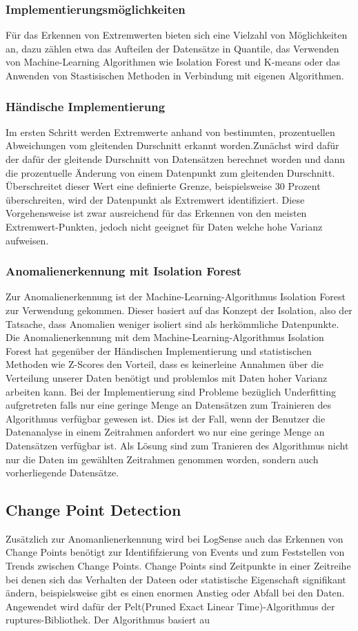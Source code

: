 \documentclass{report}
\begin{document}
\subsubsection{Implementierungsmöglichkeiten}
Für das Erkennen von Extremwerten bieten sich eine Vielzahl von Möglichkeiten an, dazu zählen etwa das Aufteilen der Datensätze in Quantile, das Verwenden von Machine-Learning Algorithmen wie Isolation Forest und K-means oder das Anwenden von Stastisischen Methoden in Verbindung mit eigenen Algorithmen. 
\subsubsection{Händische Implementierung}
Im ersten Schritt werden Extremwerte anhand von bestimmten, prozentuellen Abweichungen vom gleitenden Durschnitt erkannt worden.Zunächst wird dafür der dafür der gleitende Durschnitt von Datensätzen berechnet worden und dann die prozentuelle Änderung von einem Datenpunkt zum gleitenden Durschnitt. Überschreitet dieser Wert eine definierte Grenze, beispielsweise 30 Prozent überschreiten, wird der Datenpunkt als Extremwert identifiziert.
Diese Vorgehensweise ist zwar ausreichend für das Erkennen von den meisten Extremwert-Punkten, jedoch nicht geeignet für Daten welche hohe Varianz aufweisen. 
\subsubsection{Anomalienerkennung mit Isolation Forest}
Zur Anomalienerkennung ist der Machine-Learning-Algorithmus Isolation Forest zur Verwendung gekommen. Dieser basiert auf das Konzept der Isolation, also der Tatsache, dass Anomalien weniger isoliert sind als herkömmliche Datenpunkte. 
Die Anomalienerkennung mit dem Machine-Learning-Algorithmus Isolation Forest hat gegenüber der Händischen Implementierung und statistischen Methoden wie Z-Scores den Vorteil, dass es keinerleine Annahmen über die Verteilung unserer Daten benötigt und problemlos mit Daten hoher Varianz arbeiten kann.
Bei der Implementierung sind Probleme bezüglich Underfitting aufgretreten falls nur eine geringe Menge an Datensätzen zum Trainieren des Algorithmus verfügbar gewesen ist. Dies ist der Fall, wenn der Benutzer die Datenanalyse in einem Zeitrahmen anfordert wo nur eine geringe Menge an Datensätzen verfügbar ist. Als Lösung sind zum Tranieren des Algorithmus nicht nur die Daten im gewählten Zeitrahmen genommen worden, sondern auch vorherliegende Datensätze. 
\subsection{Change Point Detection}
Zusätzlich zur Anomanlienerkennung wird bei LogSense auch das Erkennen von Change Points benötigt zur Identififzierung von Events und zum Feststellen von Trends zwischen Change Points. Change Points sind Zeitpunkte in einer Zeitreihe bei denen sich das Verhalten der Dateen oder statistische Eigenschaft signifikant ändern, beispielsweise gibt es einen enormen Anstieg oder Abfall bei den Daten. Angewendet wird dafür der Pelt(Pruned Exact Linear Time)-Algorithmus der ruptures-Bibliothek. Der Algorithmus basiert au
\end{document}
